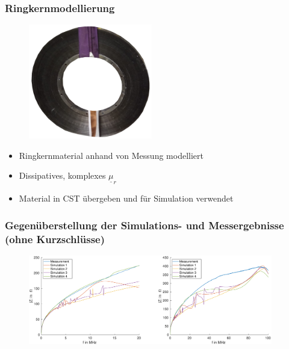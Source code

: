 \documentclass[accentcolor=tud9b, colorbacktitle, inverttitle]{tudbeamer}
\begin{document}
\begin{frame}\frametitle{Ringkernmodellierung}
\vspace{-1em}
\begin{multicols}{2}
\begin{figure}[h]
	\centering
	\includegraphics[width=0.48\textwidth]{ringkern.jpg}
\end{figure}
\vfill\null
\columnbreak
\begin{itemize}
	\item Ringkernmaterial anhand von Messung modelliert
	\item Dissipatives, komplexes $\underline{\mu}_r$
	\item Material in CST \"ubergeben und f\"ur Simulation verwendet
\end{itemize}
\end{multicols}
\end{frame}


% 



\begin{frame}\frametitle{Gegen\"uberstellung der Simulations- und Messergebnisse (ohne Kurzschl\"usse)}
\vspace{-1em}
\begin{figure}[h]
	\centering
	\includegraphics[width=0.95\textwidth]{Zges_RK_SimMeas}
\end{figure}
\end{frame}
\end{document}
